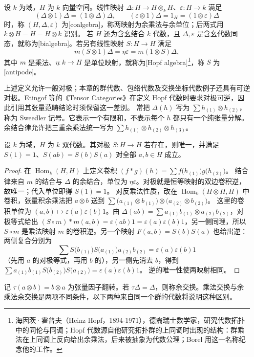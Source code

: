 \begin{definition}\label{b5:def:coalgebra-hopf}
	设 \(k\) 为域，\(H\) 为 \(k\) 向量空间。线性映射 \(\Delta:H\to H\otimes_kH\)、\(\varepsilon:H\to k\) 满足
	\[
		(\Delta\otimes1)\Delta=(1\otimes\Delta)\Delta,\qquad (\varepsilon\otimes1)\Delta=1_H=(1\otimes\varepsilon)\Delta
	\]
	时，称 \((H,\Delta,\varepsilon)\) 为[coalgebra]，称两映射为余乘法与余单位；后两式用 \(k\otimes H=H=H\otimes k\) 识别。 若 \(H\) 还为含幺结合 \(k\) 代数，且 \(\Delta,\varepsilon\) 是含幺代数同态，就称为[bialgebra]。若另有线性映射 \(S:H\to H\) 满足
	\[
		m(S\otimes1)\Delta=\eta\varepsilon=m(1\otimes S)\Delta,
	\]
	其中 \(m\) 是乘法、\(\eta:k\to H\) 是单位映射，就称为[Hopf algebra]\footnote{海因茨·霍普夫（Heinz Hopf，1894-1971），德裔瑞士数学家，研究代数拓扑中的同伦与同调；Hopf 代数源自他研究拓扑群的上同调时出现的结构：群乘法在上同调上反向给出余乘法，后来被抽象为代数公理；Borel 用这一名称纪念他的工作。}，称 \(S\) 为[antipode]。
\end{definition}
上述定义允许一般对极；本章的群代数、包络代数及交换坐标代数例子还具有可逆对极。Etingof 等的《Tensor Categories》在定义 Hopf 代数时要求对极可逆，因此引用其张量范畴结论时须保留这一差别。
\ProseParagraphBreak
常把 \(\Delta(h)\) 写为 \(\sum h_{(1)}\otimes h_{(2)}\)，称为 Sweedler 记号。它表示一个有限和，不表示每个 \(h\) 都只有一个纯张量分解。余结合律允许把三重余乘法统一写为 \(\sum h_{(1)}\otimes h_{(2)}\otimes h_{(3)}\)。
\begin{proposition}\label{b5:prop:antipode-unique}
	设 \(k\) 为域，\(H\) 为 \(k\) 双代数。其对极 \(S:H\to H\) 若存在，则唯一，并满足 \(S(1)=1\)、\(S(ab)=S(b)S(a)\) 对全部 \(a,b\in H\) 成立。
\end{proposition}
\begin{proof}
	在 \(\operatorname{Hom}_k(H,H)\) 上定义卷积 \((f*g)(h)=\sum f\bigl(h_{(1)}\bigr)g\bigl(h_{(2)}\bigr)\)。 结合律来自 \(m\) 的结合与 \(\Delta\) 的余结合，单位为 \(\eta\varepsilon\)。对极就是恒等映射的双边卷积逆，故唯一；代入单位即得 \(S(1)=1\)。 对反乘法性质，改在 \(\operatorname{Hom}_k(H\otimes H,H)\) 中卷积，张量积余乘法把 \(a\otimes b\) 送到 \(\sum\bigl(a_{(1)}\otimes b_{(1)}\bigr)\otimes\bigl(a_{(2)}\otimes b_{(2)}\bigr)\)。 这里的卷积单位为 \((a,b)\mapsto\varepsilon(a)\varepsilon(b)1\)。由 \(\Delta(ab)=\sum a_{(1)}b_{(1)}\otimes a_{(2)}b_{(2)}\)，对极等式给出 \((S\circ m)*m(a,b)=\varepsilon(ab)1=\varepsilon(a)\varepsilon(b)1\)，另一侧同理，所以 \(S\circ m\) 是乘法映射 \(m\) 的卷积逆。另一个映射 \(F(a,b)=S(b)S(a)\) 也给出逆：两侧复合分别为
	\[
		\sum S\bigl(b_{(1)}\bigr)S\bigl(a_{(1)}\bigr)a_{(2)}b_{(2)} =\varepsilon(a)\varepsilon(b)1
	\]
	（先用 \(a\) 的对极等式，再用 \(b\) 的），另一侧先消去 \(b\)，得到 \(\sum a_{(1)}b_{(1)}S\bigl(b_{(2)}\bigr)S\bigl(a_{(2)}\bigr)=\varepsilon(a)\varepsilon(b)1\)。 逆的唯一性使两映射相同。
\end{proof}
记 \(\tau(a\otimes b)=b\otimes a\) 为张量因子翻转。若 \(\tau\Delta=\Delta\)，则称余交换。乘法交换与余乘法余交换是两项不同条件，以下两种来自同一个群的代数将说明这种区别。

